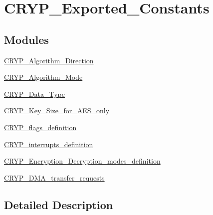 \hypertarget{group___c_r_y_p___exported___constants}{}\section{C\+R\+Y\+P\+\_\+\+Exported\+\_\+\+Constants}
\label{group___c_r_y_p___exported___constants}
\subsection*{Modules}
\begin{DoxyCompactItemize}
\item 
\hyperlink{group___c_r_y_p___algorithm___direction}{C\+R\+Y\+P\+\_\+\+Algorithm\+\_\+\+Direction}
\item 
\hyperlink{group___c_r_y_p___algorithm___mode}{C\+R\+Y\+P\+\_\+\+Algorithm\+\_\+\+Mode}
\item 
\hyperlink{group___c_r_y_p___data___type}{C\+R\+Y\+P\+\_\+\+Data\+\_\+\+Type}
\item 
\hyperlink{group___c_r_y_p___key___size__for___a_e_s__only}{C\+R\+Y\+P\+\_\+\+Key\+\_\+\+Size\+\_\+for\+\_\+\+A\+E\+S\+\_\+only}
\item 
\hyperlink{group___c_r_y_p__flags__definition}{C\+R\+Y\+P\+\_\+flags\+\_\+definition}
\item 
\hyperlink{group___c_r_y_p__interrupts__definition}{C\+R\+Y\+P\+\_\+interrupts\+\_\+definition}
\item 
\hyperlink{group___c_r_y_p___encryption___decryption__modes__definition}{C\+R\+Y\+P\+\_\+\+Encryption\+\_\+\+Decryption\+\_\+modes\+\_\+definition}
\item 
\hyperlink{group___c_r_y_p___d_m_a__transfer__requests}{C\+R\+Y\+P\+\_\+\+D\+M\+A\+\_\+transfer\+\_\+requests}
\end{DoxyCompactItemize}


\subsection{Detailed Description}
